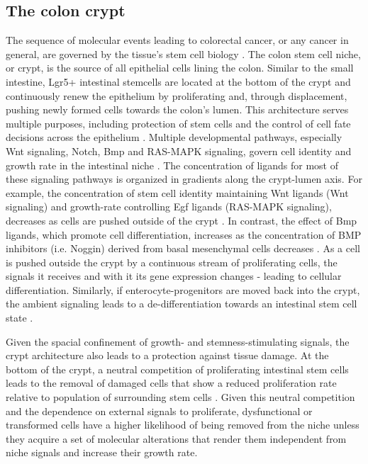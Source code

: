 \begin{flushleft}
\subsection{The colon crypt}
The sequence of molecular events leading to colorectal cancer, or any cancer in general, are governed by the tissue's stem cell biology \citep{cleversCancerStemCell2011}. The colon stem cell niche, or crypt, is the source of all epithelial cells lining the colon. Similar to the small intestine, Lgr5+ intestinal stemcells are located at the bottom of the crypt and continuously renew the epithelium by proliferating and, through displacement, pushing newly formed cells towards the colon's lumen. This architecture serves multiple purposes, including protection of stem cells and the control of cell fate decisions across the epithelium \citep{cleversIntestinalCryptPrototype2013a}. Multiple developmental pathways, especially Wnt signaling, Notch, Bmp and RAS-MAPK signaling, govern cell identity and growth rate in the intestinal niche \citep{hTalesCryptNew2019}. The concentration of ligands for most of these signaling pathways is organized in gradients along the crypt-lumen axis. For example, the concentration of stem cell identity maintaining Wnt ligands (Wnt signaling) and growth-rate controlling Egf ligands (RAS-MAPK signaling), decreases as cells are pushed outside of the crypt \citep{sasakiReg4DeepCrypt2016}. In contrast, the effect of Bmp ligands, which promote cell differentiation, increases as the concentration of BMP inhibitors (i.e. Noggin) derived from basal mesenchymal cells decreases \citep{heBMPSignalingInhibits2004}. As a cell is pushed outside the crypt by a continuous stream of proliferating cells, the signals it receives and with it its gene expression changes - leading to cellular differentiation. Similarly, if enterocyte-progenitors are moved back into the crypt, the ambient signaling leads to a de-differentiation towards an intestinal stem cell state \citep{tettehReplacementLostLgr5Positive2016a}. \par

Given the spacial confinement of growth- and stemness-stimulating signals, the crypt architecture also leads to a protection against tissue damage. At the bottom of the crypt, a neutral competition of proliferating intestinal stem cells leads to the removal of damaged cells that show a reduced proliferation rate relative to population of surrounding stem cells \citep{snippertIntestinalCryptHomeostasis2010a}. Given this neutral competition and the dependence on external signals to proliferate, dysfunctional or transformed cells have a higher likelihood of being removed from the niche unless they acquire a set of molecular alterations that render them independent from niche signals and increase their growth rate. \par


\end{flushleft}
